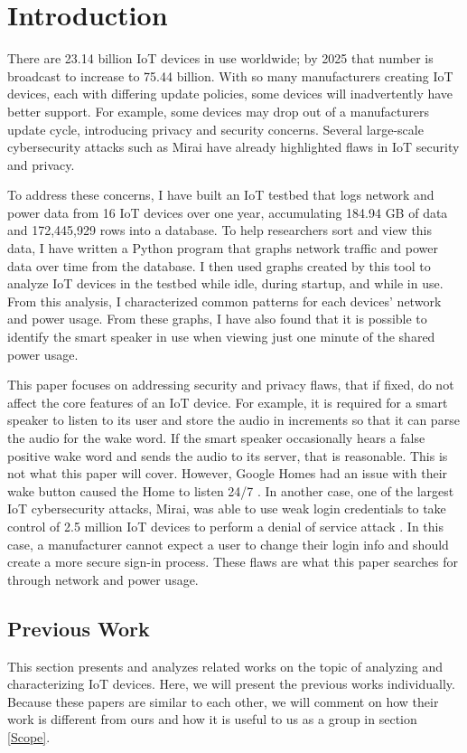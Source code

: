 \chapter{Introduction}
\label{Introduction}
There are 23.14 billion IoT devices in use worldwide; by 2025 that number is broadcast to increase to 75.44 billion\cite{statista_2016}. With so many manufacturers creating IoT devices, each with differing update policies, some devices will inadvertently have better support. For example, some devices may drop out of a manufacturers update cycle, introducing privacy and security concerns. Several large-scale cybersecurity attacks such as Mirai \cite{iotforall_2017} have already highlighted flaws in IoT security and privacy.

To address these concerns, I have built an IoT testbed that logs network and power data from 16 IoT devices over one year, accumulating 184.94 GB of data and 172,445,929 rows into a database. To help researchers sort and view this data, I have written a Python program that graphs network traffic and power data over time from the database. I then used graphs created by this tool to analyze IoT devices in the testbed while idle, during startup, and while in use. From this analysis, I characterized common patterns for each devices' network and power usage. From these graphs, I have also found that it is possible to identify the smart speaker in use when viewing just one minute of the shared power usage.

This paper focuses on addressing security and privacy flaws, that if fixed, do not affect the core features of an IoT device. For example, it is required for a smart speaker to listen to its user and store the audio in increments so that it can parse the audio for the wake word. If the smart speaker occasionally hears a false positive wake word and sends the audio to its server, that is reasonable. This is not what this paper will cover. However, Google Homes had an issue with their wake button caused the Home to listen 24/7 \cite{burke_2017}. In another case, one of the largest IoT cybersecurity attacks, Mirai, was able to use weak login credentials to take control of 2.5 million IoT devices to perform a denial of service attack \cite{whittaker_2017}. In this case, a manufacturer cannot expect a user to change their login info and should create a more secure sign-in process. These flaws are what this paper searches for through network and power usage.

\section{Previous Work}
This section presents and analyzes related works on the topic of analyzing and characterizing IoT devices. Here, we will present the previous works individually. Because these papers are similar to each other, we will comment on how their work is different from ours and how it is useful to us as a group in section \ref{Scope}.

